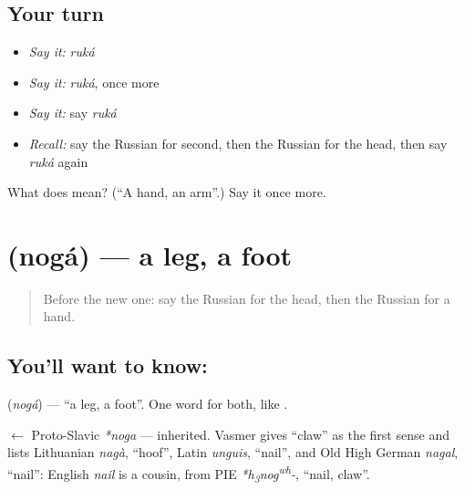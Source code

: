 \subsection*{Your turn}
\begin{itemize}
\raggedright
  \item \emph{Say it:} \emph{ruká}
  \item \emph{Say it:} \emph{ruká}, once more
  \item \emph{Say it:} say \emph{ruká}
  \item \emph{Recall:} say the Russian for second, then the Russian for the head, then say \emph{ruká} again
\end{itemize}

\begin{tcolorbox}[breakable,colback=teal!4,colframe=teal!35!black,title={Before you move on}]
What does  mean? (\textquotedblleft{}A hand, an arm\textquotedblright{}.) Say it once more.
\end{tcolorbox}
\section[\texorpdfstring{\ru{нога} (nogá)}{нога (nogá)}]{ (nogá) — a leg, a foot}

\label{lesson:RU-C29-leg}



\begin{quote}
Before the new one: say the Russian for the head, then the Russian for a hand.
\end{quote}

\subsection*{You'll want to know: }
\textbf{} (\emph{nogá}) — \textquotedblleft{}a leg, a foot\textquotedblright{}. One word for both, like \textbf{}.

\begin{cousinweb}
\textbf{} $\leftarrow$ Proto-Slavic \emph{*noga} — inherited. Vasmer gives \textquotedblleft{}claw\textquotedblright{} as the first sense and lists Lithuanian \emph{nagà}, \textquotedblleft{}hoof\textquotedblright{}, Latin \emph{unguis}, \textquotedblleft{}nail\textquotedblright{}, and Old High German \emph{nagal}, \textquotedblleft{}nail\textquotedblright{}: English \emph{nail} is a cousin, from PIE \emph{*h\textsubscript{3}nog\textsuperscript{w}\textsuperscript{h}-}, \textquotedblleft{}nail, claw\textquotedblright{}.
\end{cousinweb}

